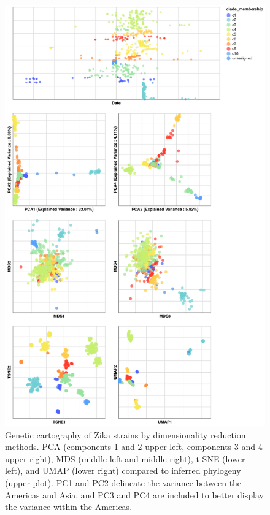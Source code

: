 \documentclass[9pt,lineno]{elife}
\begin{document}
\begin{figure}[htb]
  \begin{center}
  \includegraphics[width=\columnwidth]{zika-embeddings}
  \caption{
    Genetic cartography of Zika strains by dimensionality reduction methods.
    PCA (components 1 and 2 upper left, components 3 and 4 upper right), MDS (middle left and middle right), t-SNE (lower left), and UMAP (lower right) compared to inferred phylogeny (upper plot).
    PC1 and PC2 delineate the variance between the Americas and Asia, and PC3 and PC4 are included to better display the variance within the Americas.
  }
  \label{fig:zika-embeddings}
  \end{center}
\end{figure}
\end{document}
